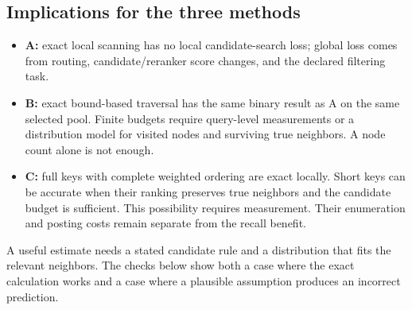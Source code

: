 \subsection{Implications for the three methods}
\begin{itemize}
\item \textbf{A:} exact local scanning has no local candidate-search loss; global loss comes
from routing, candidate/reranker score changes, and the declared filtering task.
\item \textbf{B:} exact bound-based traversal has the same binary result as A on the same
selected pool. Finite budgets require query-level measurements or a distribution model for
visited nodes and surviving true neighbors. A node count alone is not enough.
\item \textbf{C:} full keys with complete weighted ordering are exact locally. Short keys can
be accurate when their ranking preserves true neighbors and the candidate budget is sufficient.
This possibility requires measurement. Their enumeration and posting costs remain
separate from the recall benefit.
\end{itemize}
A useful estimate needs a stated candidate rule and a distribution that fits the relevant
neighbors. The checks below show both a case where the exact calculation works and a case
where a plausible assumption produces an incorrect prediction.
